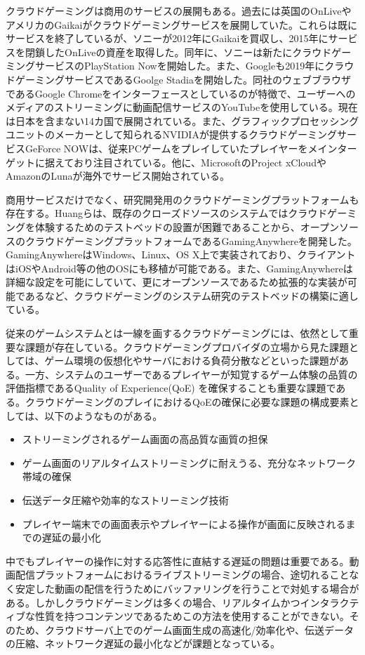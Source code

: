 クラウドゲーミングは商用のサービスの展開もある。過去には英国のOnLive\cite{onlive}やアメリカのGaikaiがクラウドゲーミングサービスを展開していた。これらは既にサービスを終了しているが、ソニーが2012年にGaikaiを買収し、2015年にサービスを閉鎖したOnLiveの資産を取得した\cite{onlive-sony-gaikai}。同年に、ソニーは新たにクラウドゲーミングサービスのPlayStation Now\cite{ps-now}を開始した。また、Googleも2019年にクラウドゲーミングサービスであるGoolge Stadia\cite{stadia}を開始した。同社のウェブブラウザであるGoogle Chromeをインターフェースとしているのが特徴で、ユーザーへのメディアのストリーミングに動画配信サービスのYouTubeを使用している。現在は日本を含まない14カ国で展開されている。また、グラフィックプロセッシングユニットのメーカーとして知られるNVIDIAが提供するクラウドゲーミングサービスGeForce NOW\cite{geforce-now}は、従来PCゲームをプレイしていたプレイヤーをメインターゲットに据えており注目されている。他に、MicrosoftのProject xCloudやAmazonのLunaが海外でサービス開始されている。

商用サービスだけでなく、研究開発用のクラウドゲーミングプラットフォームも存在する。Huangら\cite{gaminganywhere}は、既存のクローズドソースのシステムではクラウドゲーミングを体験するためのテストベッドの設置が困難であることから、オープンソースのクラウドゲーミングプラットフォームであるGamingAnywhereを開発した。GamingAnywhereはWindows、Linux、OS X上で実装されており、クライアントはiOSやAndroid等の他のOSにも移植が可能である。また、GamingAnywhereは詳細な設定を可能にしていて、更にオープンソースであるため拡張的な実装が可能であるなど、クラウドゲーミングのシステム研究のテストベッドの構築に適している。

従来のゲームシステムとは一線を画するクラウドゲーミングには、依然として重要な課題が存在している\cite{cloudgaming-survey}。クラウドゲーミングプロバイダの立場から見た課題としては、ゲーム環境の仮想化やサーバにおける負荷分散などといった課題がある。一方、システムのユーザーであるプレイヤーが知覚するゲーム体験の品質の評価指標であるQuality of Experience(QoE)
を確保することも重要な課題である。クラウドゲーミングのプレイにおけるQoEの確保に必要な課題の構成要素としては、以下のようなものがある。
\begin{itemize}
    \item ストリーミングされるゲーム画面の高品質な画質の担保
    \item ゲーム画面のリアルタイムストリーミングに耐えうる、充分なネットワーク帯域の確保
    \item 伝送データ圧縮や効率的なストリーミング技術
    \item プレイヤー端末での画面表示やプレイヤーによる操作が画面に反映されるまでの遅延の最小化
\end{itemize}
中でもプレイヤーの操作に対する応答性に直結する遅延の問題は重要である。動画配信プラットフォームにおけるライブストリーミングの場合、途切れることなく安定した動画の配信を行うためにバッファリングを行うことで対処する場合がある。しかしクラウドゲーミングは多くの場合、リアルタイムかつインタラクティブな性質を持つコンテンツであるためこの方法を使用することができない。そのため、クラウドサーバ上でのゲーム画面生成の高速化/効率化や、伝送データの圧縮、ネットワーク遅延の最小化などが課題となっている。

